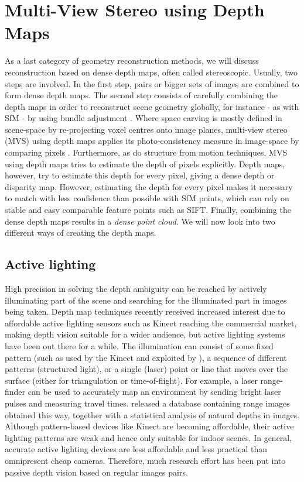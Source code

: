 \section{Multi-View Stereo using Depth Maps}  \label{mvs}
As a last category of geometry reconstruction methods, we will discuss reconstruction based on dense depth maps, often called stereoscopic. Usually, two steps are involved. In the first step, pairs or bigger sets of images are combined to form dense depth maps. The second step consists of carefully combining the depth maps in order to reconstruct scene geometry globally, for instance - as with SfM - by using bundle adjustment \cite{Wu2011}. Where space carving is mostly defined in scene-space by re-projecting voxel centres onto image planes, multi-view stereo (MVS) using depth maps applies its photo-consistency measure in image-space by comparing pixels \cite{Seitz2006}. Furthermore, as do structure from motion techniques, MVS using depth maps tries to estimate the depth of pixels explicitly. Depth maps, however, try to estimate this depth for every pixel, giving a dense depth or disparity map. However, estimating the depth for every pixel makes it necessary to match with less confidence than possible with SfM points, which can rely on stable and easy comparable feature points such as SIFT. Finally, combining the dense depth maps results in a \emph{dense point cloud}. We will now look into two different ways of creating the depth maps.

\subsection{Active lighting}
High precision in solving the depth ambiguity can be reached by actively illuminating part of the scene and searching for the illuminated part in images being taken. Depth map techniques recently received increased interest due to affordable active lighting sensors such as Kinect \cite{Izadi2011} reaching the commercial market, making depth vision suitable for a wider audience, but active lighting systems have been out there for a while. The illumination can consist of some fixed pattern (such as used by the Kinect and exploited by ), a sequence of different patterns (structured light), or a single (laser) point or line that moves over the surface (either for triangulation or time-of-flight). For example, a laser range-finder can be used to accurately map an environment by sending bright laser pulses and measuring travel times.  released a database containing range images obtained this way, together with a statistical analysis of natural depths in images. Although pattern-based devices like Kinect are becoming affordable, their active lighting patterns are weak and hence only suitable for indoor scenes. In general, accurate active lighting devices are less affordable and less practical than omnipresent cheap cameras. Therefore, much research effort has been put into passive depth vision based on regular images pairs.

